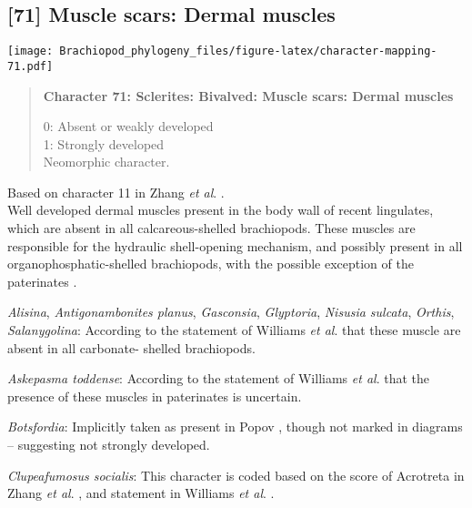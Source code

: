 \documentclass[openany]{book}
\theoremstyle{definition}
\theoremstyle{definition}
\theoremstyle{definition}
\theoremstyle{remark}
\begin{document}
\subsection*{{[}71{]} Muscle scars: Dermal
muscles}\label{muscle-scars-dermal-muscles}

\texttt{[image: Brachiopod\_phylogeny\_files/figure-latex/character-mapping-71.pdf]}

\begin{quote}
\textbf{Character 71: Sclerites: Bivalved: Muscle scars: Dermal muscles}

0: Absent or weakly developed\\
1: Strongly developed\\
Neomorphic character.
\end{quote}

Based on character 11 in Zhang \emph{et al}.
\citeyearpar{Zhang2014Anearly}.\\
Well developed dermal muscles present in the body wall of recent
lingulates, which are absent in all calcareous-shelled brachiopods.
These muscles are responsible for the hydraulic shell-opening mechanism,
and possibly present in all organophosphatic-shelled brachiopods, with
the possible exception of the paterinates
\citep[p.~32]{Williams2000LinguliformeaCraniiformea}.

\hypertarget{Alisina-coding-71}{}
\emph{Alisina}, \emph{Antigonambonites planus}, \emph{Gasconsia},
\emph{Glyptoria}, \emph{Nisusia sulcata}, \emph{Orthis},
\emph{Salanygolina}: According to the statement of Williams \emph{et
al}. \citeyearpar[p.~32]{Williams2000LinguliformeaCraniiformea} that
these muscle are absent in all carbonate- shelled brachiopods.

\hypertarget{Askepasma_toddense-coding-71}{}
\emph{Askepasma toddense}: According to the statement of Williams
\emph{et al}. \citeyearpar[p.~32]{Williams2000LinguliformeaCraniiformea}
that the presence of these muscles in paterinates is uncertain.

\hypertarget{Botsfordia-coding-71}{}
\emph{Botsfordia}: Implicitly taken as present in Popov
\citeyearpar{Popov1992TheCambrian}, though not marked in diagrams --
suggesting not strongly developed.

\hypertarget{Clupeafumosus_socialis-coding-71}{}
\emph{Clupeafumosus socialis}: This character is coded based on the
score of Acrotreta in Zhang \emph{et al}.
\citeyearpar{Zhang2014Anearly}, and statement in Williams \emph{et al}.
\citeyearpar[P.32]{Williams2000LinguliformeaCraniiformea}.
\end{document}
